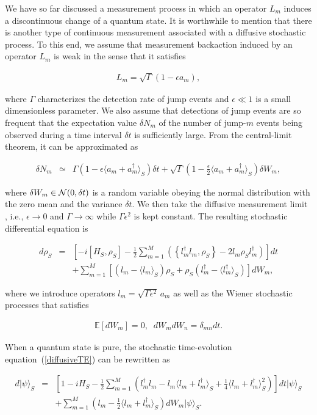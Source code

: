 \documentclass{tADP2e}
\theoremstyle{plain}
\newcommand{\eqn}[1]{
\begin{eqnarray}
	#1
\end{eqnarray}
}
\theoremstyle{plain}
\theoremstyle{definition}
\begin{document}
\vspace{3pt}
\noindent
We have so far discussed a measurement process in which an operator $ {L}_{m}$ induces a discontinuous change of a quantum state. It is worthwhile to mention that there is another type of continuous measurement associated with a diffusive stochastic process. To this end, we assume that measurement backaction induced by an operator $ {L}_{m}$ is weak in the sense that it satisfies
\eqn{
 {L}_{m}=\sqrt{\Gamma}(1-\epsilon {a}_{m}),
}
where $\Gamma$ characterizes the detection rate of jump events  and $\epsilon\ll 1$ is a small dimensionless parameter.
We also assume that detections of jump events are so frequent that the expectation value $\delta N_m$ of the number of jump-$m$ events being observed during a time interval $\delta t$ is sufficiently large. From the central-limit theorem, it can  be approximated as
\eqn{
\delta N_{m}  & \simeq&\Gamma(1-\epsilon\langle {a}_{m}+ {a}_{m}^{\dagger}\rangle_{S})\delta t+\sqrt{\Gamma}\left(1-\frac{\epsilon}{2}\langle {a}_{m}+ {a}_{m}^{\dagger}\rangle_{S}\right)\delta W_{m},
}
where $\delta W_{m}\in{\cal N}(0,\delta t)$ is a random variable obeying the normal distribution with the zero mean and the variance $\delta t$. We then take the diffusive measurement limit \cite{WHM10}, i.e., $\epsilon\to 0$ and $\Gamma\to\infty$ while $\Gamma \epsilon^2$ is kept constant.  The resulting stochastic  differential equation is
\eqn{\label{diffusiveTE}
d {\rho}_{S}&=&\left[-i[ {H}_{S}, {\rho}_{S}]-\frac{1}{2}\sum_{m=1}^{M}\left(\left\{  {l}_{m}^{\dagger} {l}_{m}, {\rho}_{S}\right\} -2 {l}_{m} {\rho}_{S} {l}_{m}^{\dagger}\right)\right]dt\nonumber\\
&&+\sum_{m=1}^{M}\left[\left( {l}_{m}-\langle {l}_{m}\rangle_{S}\right) {\rho}_{S}+ {\rho}_{S}\left( {l}_{m}^{\dagger}-\langle {l}_{m}^{\dagger}\rangle_{S}\right)\right]dW_{m},
}
where we introduce operators $ {l}_{m}=\sqrt{\Gamma \epsilon^2}\,{a}_{m}$ as well as the Wiener stochastic processes that satisfies
\eqn{
{\mathbb{E}}[dW_m]=0,\;\;dW_m dW_n=\delta_{m n}dt.
}
When a quantum state is pure, the  stochastic time-evolution equation~(\ref{diffusiveTE}) can be rewritten as
\eqn{
d|\psi\rangle_{S}&=&\left[1-i {H}_{S}-\frac{1}{2}\sum_{m=1}^{M}\left( {l}_{m}^{\dagger} {l}_{m}- {l}_{m}\langle {l}_{m}+ {l}_{m}^{\dagger}\rangle_{S}+\frac{1}{4}\langle {l}_{m}+ {l}_{m}^{\dagger}\rangle_{S}^{2}\right)\right]dt|\psi\rangle_{S}\nonumber\\
&&+\sum_{m=1}^{M}\left( {l}_{m}-\frac{1}{2}\langle {l}_{m}+ {l}_{m}^{\dagger}\rangle_{S}\right)dW_{m}|\psi\rangle_{S}.
}
\end{document}

